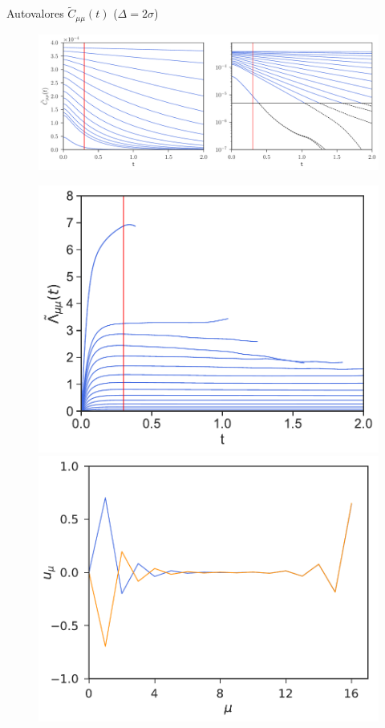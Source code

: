 \documentclass{beamer}
\begin{document}
\begin{frame}{Autovalores $\tilde{C}_{\mu\mu}(t)$ ($\Delta=2\sigma$)}
\begin{figure}[h!]
  \includegraphics[width=0.87\linewidth]{CtRec-WALLS-17nodes-exp}
\end{figure}
\begin{figure}[h!]
\includegraphics[scale=0.315]{LambdatRec-WALLS-17nodes}
\includegraphics[scale=0.315]{Eigenvectors-WALLS-17nodes}
\end{figure}
\end{frame}
\end{document}
